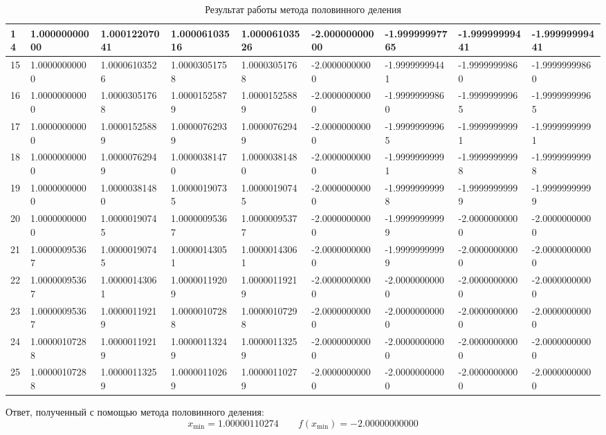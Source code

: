 \begin{table}[H]
{\begin{tabular}{|l|l|l|l|l|l|l|l|l|}
    \hline
14 & 1.00000000000 & 1.00012207041 & 1.00006103516 & 1.00006103526 & -2.00000000000 & -1.99999997765 & -1.99999999441 & -1.99999999441 \\
    \hline
15 & 1.00000000000 & 1.00006103526 & 1.00003051758 & 1.00003051768 & -2.00000000000 & -1.99999999441 & -1.99999999860 & -1.99999999860 \\
    \hline
16 & 1.00000000000 & 1.00003051768 & 1.00001525879 & 1.00001525889 & -2.00000000000 & -1.99999999860 & -1.99999999965 & -1.99999999965 \\
    \hline
17 & 1.00000000000 & 1.00001525889 & 1.00000762939 & 1.00000762949 & -2.00000000000 & -1.99999999965 & -1.99999999991 & -1.99999999991 \\
    \hline
18 & 1.00000000000 & 1.00000762949 & 1.00000381470 & 1.00000381480 & -2.00000000000 & -1.99999999991 & -1.99999999998 & -1.99999999998 \\
    \hline
19 & 1.00000000000 & 1.00000381480 & 1.00000190735 & 1.00000190745 & -2.00000000000 & -1.99999999998 & -1.99999999999 & -1.99999999999 \\
    \hline
20 & 1.00000000000 & 1.00000190745 & 1.00000095367 & 1.00000095377 & -2.00000000000 & -1.99999999999 & -2.00000000000 & -2.00000000000 \\
    \hline
21 & 1.00000095367 & 1.00000190745 & 1.00000143051 & 1.00000143061 & -2.00000000000 & -1.99999999999 & -2.00000000000 & -2.00000000000 \\
    \hline
22 & 1.00000095367 & 1.00000143061 & 1.00000119209 & 1.00000119219 & -2.00000000000 & -2.00000000000 & -2.00000000000 & -2.00000000000 \\
    \hline
23 & 1.00000095367 & 1.00000119219 & 1.00000107288 & 1.00000107298 & -2.00000000000 & -2.00000000000 & -2.00000000000 & -2.00000000000 \\
    \hline
24 & 1.00000107288 & 1.00000119219 & 1.00000113249 & 1.00000113259 & -2.00000000000 & -2.00000000000 & -2.00000000000 & -2.00000000000 \\
    \hline
25 & 1.00000107288 & 1.00000113259 & 1.00000110269 & 1.00000110279 & -2.00000000000 & -2.00000000000 & -2.00000000000 & -2.00000000000 \\
    \hline
  \end{tabular}}
  \caption{Результат работы метода половинного деления}
\end{table}

Ответ, полученный с помощью метода половинного деления:
\[
  x_\min = 1.00000110274
  \qquad
  f(x_{\min}) = -2.00000000000
\]

